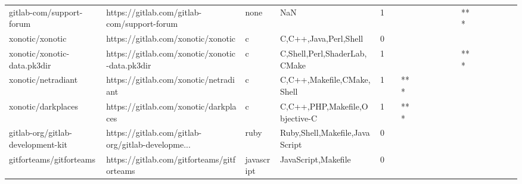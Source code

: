 \begin{tabular}{llllrlllllllllllll}
gitlab-com/support-forum                           &        https://gitlab.com/gitlab-com/support-forum &              none &                                                NaN &       1 &         &        &           &                &                 &        &           &       *** &          &          &       &              &          \\
xonotic/xonotic                                    &                 https://gitlab.com/xonotic/xonotic &                 c &                              C,C++,Java,Perl,Shell &       0 &         &        &           &                &                 &        &           &           &          &          &       &              &          \\
xonotic/xonotic-data.pk3dir                        &     https://gitlab.com/xonotic/xonotic-data.pk3dir &                 c &                       C,Shell,Perl,ShaderLab,CMake &       1 &         &        &           &                &                 &        &           &       *** &          &          &       &              &          \\
xonotic/netradiant                                 &              https://gitlab.com/xonotic/netradiant &                 c &                         C,C++,Makefile,CMake,Shell &       1 &         &    *** &           &                &                 &        &           &           &          &          &       &              &          \\
xonotic/darkplaces                                 &              https://gitlab.com/xonotic/darkplaces &                 c &                     C,C++,PHP,Makefile,Objective-C &       1 &         &    *** &           &                &                 &        &           &           &          &          &       &              &          \\
gitlab-org/gitlab-development-kit                  &  https://gitlab.com/gitlab-org/gitlab-developme... &              ruby &                     Ruby,Shell,Makefile,JavaScript &       0 &         &        &           &                &                 &        &           &           &          &          &       &              &          \\
gitforteams/gitforteams                            &         https://gitlab.com/gitforteams/gitforteams &        javascript &                                JavaScript,Makefile &       0 &         &        &           &                &                 &        &           &           &          &          &       &              &          \\

\end{tabular}
